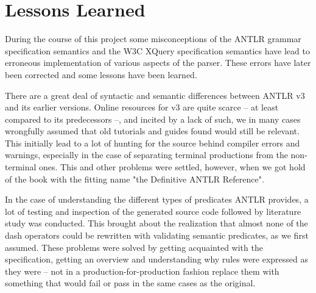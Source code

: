 \section{Lessons Learned}
\label{sect:discussion:deadEnds}
During the course of this project some misconceptions of the ANTLR grammar
specification semantics and the W3C XQuery specification semantics have lead to
erroneous implementation of various aspects of the parser. These errors have
later been corrected and some lessons have been learned.   

There are a great deal of syntactic and semantic differences between ANTLR v3
and its earlier versions. Online resources for v3 are quite scarce -- at least
compared to its predecessors --, and incited by a lack of such, we in many
cases wrongfully assumed that old tutorials and guides found would still be
relevant. This initially lead to a lot of hunting for the source behind compiler
errors and warnings, especially in the case of separating terminal productions
from the non-terminal ones. This and other problems were settled, however, when
we got hold of the book with the fitting name "the Definitive ANTLR
Reference"\cite{definitiveAntlr}.

In the case of understanding the different types of predicates ANTLR provides,
a lot of testing and inspection of the generated source code followed by
literature study was conducted. This brought about the realization that almost
none of the dash operators could be rewritten with validating semantic
predicates, as we first assumed. These problems were solved by getting
acquainted with the specification, getting an overview and understanding why rules
were expressed as they were -- not in a production-for-production fashion
replace them with something that would fail or pass in the same cases as the
original.